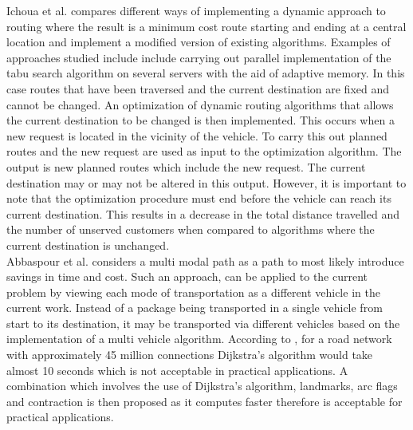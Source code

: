 \documentclass[paper=a4, fontsize=11pt]{scrartcl} %
\numberwithin{equation}{section} %
\numberwithin{figure}{section} %
\numberwithin{table}{section} %
\begin{document}
Ichoua et al. \cite{Ichoua} compares different ways of implementing a dynamic approach to routing where the result is a minimum cost route starting and ending at a central location and implement a modified version of existing algorithms. Examples of approaches studied include include carrying out parallel implementation of the tabu search algorithm on several servers with the aid of adaptive memory. In this case routes that have been traversed and the current destination are fixed and cannot be changed. An optimization of dynamic routing algorithms that allows the current destination to be changed is then implemented. This occurs when a new request is located in the vicinity of the vehicle. To carry this out planned routes and the new request are used as input to the optimization algorithm. The output is new planned routes which include the new request. The current destination may or may not be altered in this output. However, it is important to note that the optimization procedure must end before the vehicle can reach its current destination. This results in a decrease in the total distance travelled and the number of unserved customers when compared to algorithms where the current destination is unchanged. 
\\

Abbaspour et al. \cite{Abbaspour} considers a multi modal path as a path to most likely introduce savings in time and cost. Such an approach, can be applied to the current problem by viewing each mode of transportation as a different vehicle in the current work. Instead of a package being transported in a single vehicle from start to its destination, it may be transported via different vehicles based on the implementation of a multi vehicle algorithm. According to \cite{Delling}, for a road network with approximately 45 million connections Dijkstra's algorithm would take almost 10 seconds which is not acceptable in practical applications. A combination which involves the use of Dijkstra's algorithm, landmarks, arc flags and contraction is then proposed as it computes faster therefore is acceptable for practical applications. 
\\
\end{document}
